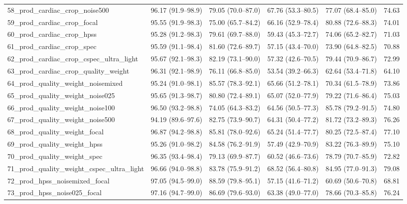 \documentclass[10pt]{article}
\begin{document}
\begin{longtable}{lccccr}
58\_prod\_cardiac\_crop\_noise500 & 96.17 (91.9--98.9) & 79.05 (70.0--87.0) & 67.76 (53.3--80.5) & 77.07 (68.4--85.0) & 74.63 \\
59\_prod\_cardiac\_crop\_focal & 95.55 (91.9--98.3) & 75.00 (65.7--84.2) & 66.16 (52.9--78.4) & 80.88 (72.6--88.3) & 74.01 \\
60\_prod\_cardiac\_crop\_hpss & 95.28 (91.2--98.3) & 79.61 (69.7--88.0) & 59.43 (45.3--72.7) & 74.06 (65.2--82.7) & 71.03 \\
61\_prod\_cardiac\_crop\_spec & 95.59 (91.1--98.4) & 81.60 (72.6--89.7) & 57.15 (43.4--70.0) & 73.90 (64.8--82.5) & 70.88 \\
62\_prod\_cardiac\_crop\_cspec\_ultra\_light & 95.67 (92.1--98.3) & 82.19 (73.1--90.0) & 57.32 (42.6--70.5) & 79.44 (70.9--86.7) & 72.99 \\
63\_prod\_cardiac\_crop\_quality\_weight & 96.31 (92.1--98.9) & 76.11 (66.8--85.0) & 53.54 (39.2--66.3) & 62.64 (53.4--71.8) & 64.10 \\
64\_prod\_quality\_weight\_noisemixed & 95.24 (91.0--98.1) & 85.57 (78.3--92.1) & 65.66 (51.2--78.1) & 70.34 (61.5--78.9) & 73.86 \\
65\_prod\_quality\_weight\_noise025 & 95.65 (91.3--98.7) & 80.80 (72.4--89.1) & 65.07 (52.0--77.9) & 79.22 (71.6--86.4) & 75.03 \\
66\_prod\_quality\_weight\_noise100 & 96.50 (93.2--98.8) & 74.05 (64.3--83.2) & 64.56 (50.5--77.3) & 85.78 (79.2--91.5) & 74.80 \\
67\_prod\_quality\_weight\_noise500 & 94.19 (89.6--97.6) & 82.75 (73.9--90.7) & 64.31 (50.4--77.2) & 81.72 (73.2--89.3) & 76.26 \\
68\_prod\_quality\_weight\_focal & 96.87 (94.2--98.8) & 85.81 (78.0--92.6) & 65.24 (51.4--77.7) & 80.25 (72.5--87.4) & 77.10 \\
69\_prod\_quality\_weight\_hpss & 95.26 (91.0--98.2) & 84.58 (76.2--91.9) & 57.49 (42.9--70.9) & 83.22 (76.3--89.9) & 75.10 \\
70\_prod\_quality\_weight\_spec & 96.35 (93.4--98.4) & 79.13 (69.9--87.7) & 60.52 (46.6--73.6) & 78.79 (70.7--85.9) & 72.82 \\
71\_prod\_quality\_weight\_cspec\_ultra\_light & 96.66 (94.0--98.8) & 83.78 (75.9--91.2) & 68.52 (56.4--80.8) & 84.95 (77.0--91.3) & 79.08 \\
72\_prod\_hpss\_noisemixed\_focal & 97.05 (94.5--99.0) & 88.59 (79.8--95.1) & 57.15 (41.6--71.2) & 60.69 (50.6--70.8) & 68.81 \\
73\_prod\_hpss\_noise025\_focal & 97.16 (94.7--99.0) & 86.69 (79.6--93.0) & 63.38 (49.0--77.0) & 78.66 (70.3--85.8) & 76.24 \\

\end{longtable}
\end{document}
